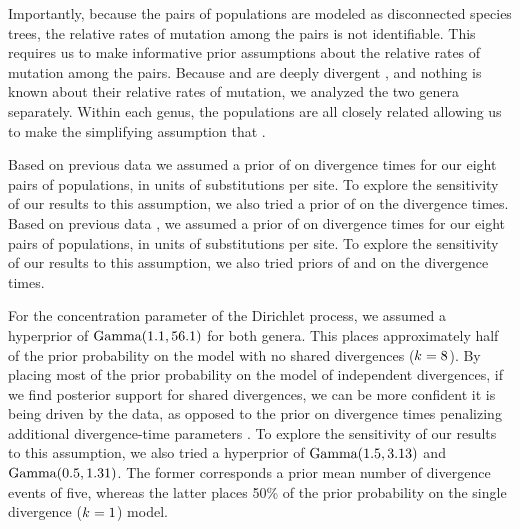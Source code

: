 Importantly, because the pairs of populations are modeled as disconnected
species trees, the relative rates of mutation among the pairs is not
identifiable.
This requires us to make informative prior assumptions about the relative rates
of mutation among the pairs.
Because  and  are deeply divergent
\citep[$>$ 80 mya;][]{Gamble2011},
and nothing is known about their relative rates of mutation, we analyzed the
two genera separately.
Within each genus, the populations are all closely related \citep{Welton2010,
    Welton2010zootaxa, Siler2010, Siler2012, Siler2014kikuchii} allowing us to
make the simplifying assumption that .

Based on previous data \citep{Welton2010, Welton2010zootaxa, Siler2010} we
assumed a prior of  on divergence times for our eight pairs
of  populations, in units of substitutions per site.
To explore the sensitivity of our results to this assumption, we also
tried a prior of  on the divergence times.
Based on previous data \citep{Siler2012, Siler2014kikuchii}, we assumed a prior
of  on divergence times for our eight pairs of 
populations, in units of substitutions per site.
To explore the sensitivity of our results to this assumption, we also tried
priors of  and  on the 
divergence times.

For the concentration parameter of the Dirichlet process, we assumed
a hyperprior of $\textrm{Gamma}(1.1, 56.1)$ for both genera.
This places approximately half of the prior probability on the model
with no shared divergences ($k_{} = 8$).
By placing most of the prior probability on the model of independent
divergences, if we find posterior support for shared divergences, we can be
more confident it is being driven by the data,
as opposed to the prior on divergence times penalizing additional
divergence-time parameters
\citep{Jeffreys1939,Lindley1957,Oaks2012,Oaks2014reply}.
To explore the sensitivity of our results to this assumption, we also
tried a hyperprior of
$\textrm{Gamma}(1.5, 3.13)$
and
$\textrm{Gamma}(0.5, 1.31)$.
The former corresponds  a prior mean number of divergence events of five,
whereas the latter places 50\% of the prior probability on the single
divergence ($k_{} = 1$) model.

